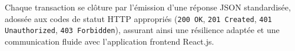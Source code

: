 Chaque transaction se clôture par l'émission d'une réponse JSON standardisée, adossée aux codes de statut HTTP appropriés (\texttt{200 OK}, \texttt{201 Created}, \texttt{401 Unauthorized}, \texttt{403 Forbidden}), assurant ainsi une résilience adaptée et une communication fluide avec l'application frontend React.js.








